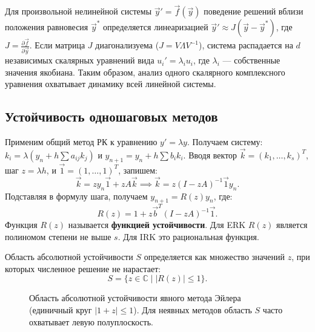 \documentclass[12pt,a4paper]{article}
\begin{document}
\begin{remark}
Для произвольной нелинейной системы $\vec{y}' = \vec{f}(\vec{y})$ поведение решений вблизи положения равновесия $\vec{y}^*$ определяется линеаризацией $\vec{y}' \approx J (\vec{y} - \vec{y}^*)$, где $J = \frac{\partial \vec{f}}{\partial \vec{y}}$. Если матрица $J$ диагонализуема ($J = V \Lambda V^{-1}$), система распадается на $d$ независимых скалярных уравнений вида $u_i' = \lambda_i u_i$, где $\lambda_i$ — собственные значения якобиана. Таким образом, анализ одного скалярного комплексного уравнения охватывает динамику всей линейной системы.
\end{remark}

\subsection{Устойчивость одношаговых методов}
Применим общий метод РК к уравнению $y' = \lambda y$. Получаем систему:
$k_i = \lambda \left( y_n + h \sum a_{ij} k_j \right)$ и $y_{n+1} = y_n + h \sum b_i k_i$.
Вводя вектор $\vec{k} = (k_1, \dots, k_s)^T$, шаг $z = \lambda h$, и $\vec{1} = (1, \dots, 1)^T$, запишем:
\[
    \vec{k} = z y_n \vec{1} + z A \vec{k} \implies \vec{k} = z (I - zA)^{-1} \vec{1} y_n.
\]
Подставляя в формулу шага, получаем $y_{n+1} = R(z) y_n$, где:
\begin{equation}
    R(z) = 1 + z \vec{b}^T (I - zA)^{-1} \vec{1}.
\end{equation}
Функция $R(z)$ называется \textbf{функцией устойчивости}. Для ERK $R(z)$ является полиномом степени не выше $s$. Для IRK это рациональная функция.

\begin{definition}
Область абсолютной устойчивости $S$ определяется как множество значений $z$, при которых численное решение не нарастает:
\[
    S = \{ z \in \mathbb{C} \mid |R(z)| \le 1 \}.
\]
\end{definition}

\begin{figure}[h]
    \centering
    \caption{Область абсолютной устойчивости явного метода Эйлера (единичный круг $|1+z| \le 1$). Для неявных методов область $S$ часто охватывает левую полуплоскость.}
\end{figure}
\end{document}
